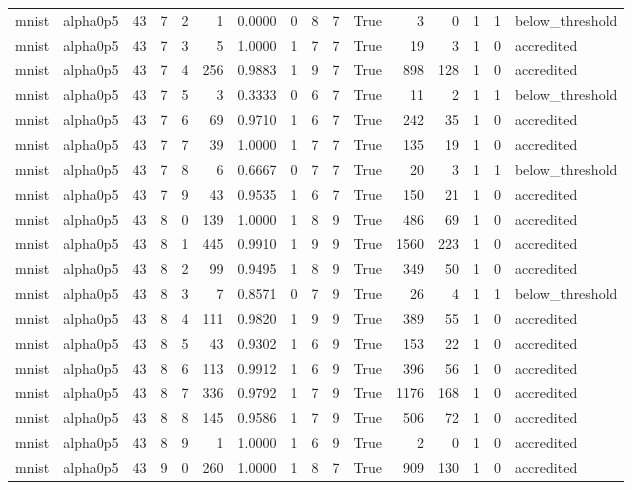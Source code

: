 \begin{tabular}{llrrrrrrrrrrrrrl}
mnist & alpha0p5 & 43 & 7 & 2 & 1 & 0.0000 & 0 & 8 & 7 & True & 3 & 0 & 1 & 1 & below\_threshold \\
mnist & alpha0p5 & 43 & 7 & 3 & 5 & 1.0000 & 1 & 7 & 7 & True & 19 & 3 & 1 & 0 & accredited \\
mnist & alpha0p5 & 43 & 7 & 4 & 256 & 0.9883 & 1 & 9 & 7 & True & 898 & 128 & 1 & 0 & accredited \\
mnist & alpha0p5 & 43 & 7 & 5 & 3 & 0.3333 & 0 & 6 & 7 & True & 11 & 2 & 1 & 1 & below\_threshold \\
mnist & alpha0p5 & 43 & 7 & 6 & 69 & 0.9710 & 1 & 6 & 7 & True & 242 & 35 & 1 & 0 & accredited \\
mnist & alpha0p5 & 43 & 7 & 7 & 39 & 1.0000 & 1 & 7 & 7 & True & 135 & 19 & 1 & 0 & accredited \\
mnist & alpha0p5 & 43 & 7 & 8 & 6 & 0.6667 & 0 & 7 & 7 & True & 20 & 3 & 1 & 1 & below\_threshold \\
mnist & alpha0p5 & 43 & 7 & 9 & 43 & 0.9535 & 1 & 6 & 7 & True & 150 & 21 & 1 & 0 & accredited \\
mnist & alpha0p5 & 43 & 8 & 0 & 139 & 1.0000 & 1 & 8 & 9 & True & 486 & 69 & 1 & 0 & accredited \\
mnist & alpha0p5 & 43 & 8 & 1 & 445 & 0.9910 & 1 & 9 & 9 & True & 1560 & 223 & 1 & 0 & accredited \\
mnist & alpha0p5 & 43 & 8 & 2 & 99 & 0.9495 & 1 & 8 & 9 & True & 349 & 50 & 1 & 0 & accredited \\
mnist & alpha0p5 & 43 & 8 & 3 & 7 & 0.8571 & 0 & 7 & 9 & True & 26 & 4 & 1 & 1 & below\_threshold \\
mnist & alpha0p5 & 43 & 8 & 4 & 111 & 0.9820 & 1 & 9 & 9 & True & 389 & 55 & 1 & 0 & accredited \\
mnist & alpha0p5 & 43 & 8 & 5 & 43 & 0.9302 & 1 & 6 & 9 & True & 153 & 22 & 1 & 0 & accredited \\
mnist & alpha0p5 & 43 & 8 & 6 & 113 & 0.9912 & 1 & 6 & 9 & True & 396 & 56 & 1 & 0 & accredited \\
mnist & alpha0p5 & 43 & 8 & 7 & 336 & 0.9792 & 1 & 7 & 9 & True & 1176 & 168 & 1 & 0 & accredited \\
mnist & alpha0p5 & 43 & 8 & 8 & 145 & 0.9586 & 1 & 7 & 9 & True & 506 & 72 & 1 & 0 & accredited \\
mnist & alpha0p5 & 43 & 8 & 9 & 1 & 1.0000 & 1 & 6 & 9 & True & 2 & 0 & 1 & 0 & accredited \\
mnist & alpha0p5 & 43 & 9 & 0 & 260 & 1.0000 & 1 & 8 & 7 & True & 909 & 130 & 1 & 0 & accredited \\

\end{tabular}
